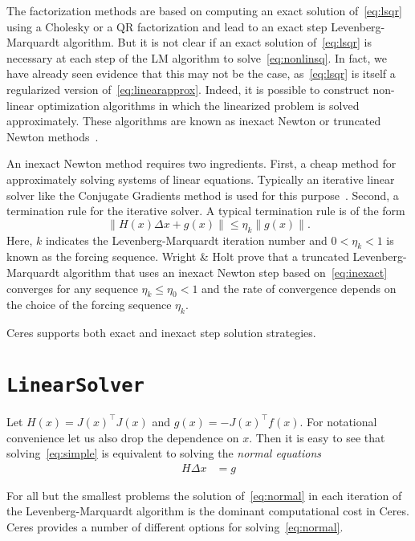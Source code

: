 The factorization methods are based on computing an exact solution of~\eqref{eq:lsqr} using a Cholesky or a QR factorization and lead to an exact step Levenberg-Marquardt algorithm. But it is not clear if an exact solution of~\eqref{eq:lsqr} is necessary at each step of the LM algorithm to solve~\eqref{eq:nonlinsq}. In fact, we have already seen evidence that this may not be the case, as~\eqref{eq:lsqr} is itself a regularized version of~\eqref{eq:linearapprox}. Indeed, it is possible to construct non-linear optimization algorithms in which the linearized problem is solved approximately. These algorithms are known as inexact Newton or truncated Newton methods~\cite{nocedal2000numerical}.

An inexact Newton method requires two ingredients. First, a cheap method for approximately solving systems of linear equations. Typically an iterative linear solver like the Conjugate Gradients method is used for this purpose~\cite{nocedal2000numerical}. Second, a termination rule for the iterative solver. A typical termination rule is of the form
\begin{equation}
        \|H(x) \Delta x + g(x)\| \leq \eta_k \|g(x)\|. \label{eq:inexact}
\end{equation}
Here, $k$ indicates the Levenberg-Marquardt iteration number and $0 < \eta_k <1$ is known as the forcing sequence.  Wright \& Holt \cite{wright1985inexact} prove that a truncated Levenberg-Marquardt algorithm that uses an inexact Newton step based on~\eqref{eq:inexact} converges for any sequence $\eta_k \leq \eta_0 < 1$ and the rate of convergence depends on the choice of the forcing sequence $\eta_k$.

Ceres supports both exact and inexact step solution strategies.

\section{\texttt{LinearSolver}}
Let $H(x)= J(x)^\top J(x)$ and $g(x) = -J(x)^\top  f(x)$. For notational convenience let us also drop the dependence on $x$. Then it is easy to see that solving~\eqref{eq:simple} is equivalent to solving the {\em normal equations}
\begin{align}
H \Delta x  &= g \label{eq:normal}
\end{align}

For all but the smallest problems the solution of~\eqref{eq:normal} in each iteration of the Levenberg-Marquardt algorithm is the dominant computational cost in Ceres. Ceres provides a number of different options for solving~\eqref{eq:normal}.

